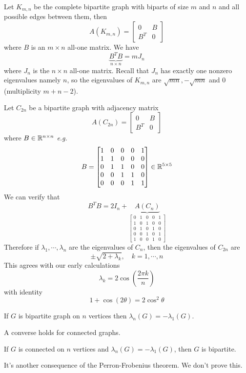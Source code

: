 \begin{example}
Let \(K_{m,n}\) be the complete bipartite graph with biparts of size \(m\) and \(n\) and all possible edges between them, then
\[ A(K_{m,n})=\begin{bmatrix}0 & B \\ B^T & 0\end{bmatrix} \]
where \(B\) is an \(m\times n\) all-one matrix. We have
\[ \underbrace{B^T B}_{n\times n} = m J_n \]
where \(J_n\) is the \(n\times n\) all-one matrix.
Recall that \(J_n\) has exactly one nonzero eigenvalues namely \(n\), so the eigenvalues of \(K_{m,n}\) are \(\sqrt{mn},-\sqrt{mn}\) and 0 (multiplicity \(m+n-2\)).
\end{example}

\begin{example}
Let \(C_{2n}\) be a bipartite graph with adjacency matrix 
\[ A(C_{2n})=\begin{bmatrix}0 & B \\ B^T & 0\end{bmatrix} \]
where \(B\in\mathbb{R}^{n\times n}\) \textit{e.g.}
\[B = \begin{bmatrix}1&0&0&0&1 \\ 1&1&0&0&0 \\ 0&1&1&0&0 \\ 0&0&1&1&0 \\ 0&0&0&1&1 \end{bmatrix}\in\mathbb{R}^{5\times 5} \]
We can verify that
\[ B^T B=2I_n+\underbrace{A(C_n)}_{\begin{bmatrix}0&1&0&0&1 \\ 1&0&1&0&0 \\ 0&1&0&1&0 \\ 0&0&1&0&1 \\ 1&0&0&1&0 \end{bmatrix}} \]
Therefore if \(\lambda_1,\cdots,\lambda_n\) are the eigenvalues of \(C_n\), then the eigenvalues of \(C_{2n}\) are
\[ \pm\sqrt{2+\lambda_k}, \quad k=1,\cdots,n \]
This agrees with our early calculations
\[ \lambda_k=2\cos\left(\frac{2\pi k}{n} \right) \]
with identity
\[ 1+\cos(2\theta)=2\cos^2\theta \]
\end{example}


\begin{corollary}
If \(G\) is bipartite graph on \(n\) vertices then \(\lambda_n(G)=-\lambda_1(G)\).
\end{corollary}
\begin{remark}
A converse holds for connected graphs.
\end{remark}
\begin{proposition}
If \(G\) is connected on \(n\) vertices and \(\lambda_n(G)=-\lambda_1(G)\), then \(G\) is bipartite.
\end{proposition}
\begin{remark}
It's another consequence of the Perron-Frobenius theorem. We don't prove this.
\end{remark}



